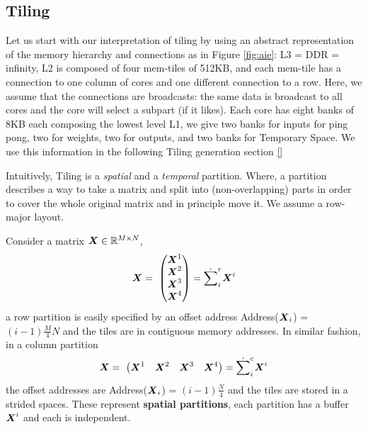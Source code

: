 \documentclass[acmsmall]{acmart}
\begin{document}
\subsection{Tiling}
\label{sec:tiling}

Let us start with our interpretation of tiling by using an abstract
representation of the memory hierarchy and connections as in Figure
\ref{fig:aie}: L3 = DDR = infinity, L2 is composed of four mem-tiles
of 512KB, and each mem-tile has a connection to one column of cores
and one different connection to a row. Here, we assume that the
connections are broadcasts: the same data is broadcast to all cores
and the core will select a subpart (if it likes). Each core has eight
banks of 8KB each composing the lowest level L1, we give two banks for
inputs for ping pong, two for weights, two for outputs, and two banks
for Temporary Space. We use this information in the following Tiling
generation section \ref{} 

Intuitively, Tiling is a {\em spatial} and a {\em temporal}
partition. Where, a partition describes a way to take a matrix and
split into (non-overlapping) parts in order to cover the whole
original matrix and in principle move it. We assume a row-major
layout.

\begin{definition}
   Consider a matrix ${\boldsymbol X} \in
  \mathbb{R}^{M\times N}$, 
  \begin{equation}
    {\boldsymbol X}  = \
    \begin{pmatrix}
      {\boldsymbol X}^1  \\
      {\boldsymbol X}^2  \\
      {\boldsymbol X}^3  \\
      {\boldsymbol X}^4  \\
    \end{pmatrix} = \dot\sum_i^r {\boldsymbol X}^i
  \end{equation}
  a row partition is easily specified by an offset address
  Address(${\boldsymbol X}_i$) = $(i-1)\frac{M}{4}N$ and the tiles are in
  contiguous memory addresses. In similar fashion, in a column
  partition
  \begin{equation}
    {\boldsymbol X}  = \
    \begin{pmatrix}
      {\boldsymbol X}^1  & {\boldsymbol X}^2  &  {\boldsymbol X}^3  &   {\boldsymbol X}^4  \\
    \end{pmatrix} = \dot\sum_i^c {\boldsymbol X}^i
  \end{equation}
  the offset addresses are Address(${\boldsymbol X}_i$) = $(i-1)\frac{N}{4}$
  and the tiles are stored in a strided spaces.  These represent {\bf
    spatial partitions}, each partition has a buffer ${\boldsymbol X}^i$ and
  each is independent.
\end{definition}
\end{document}
